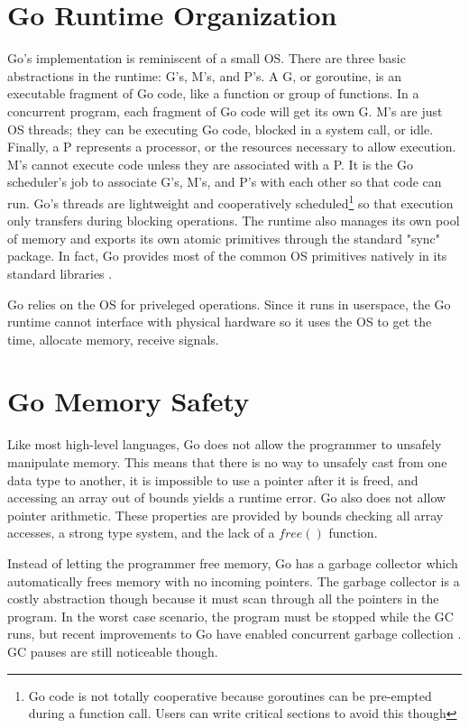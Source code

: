 \section{Go Runtime Organization}
Go's implementation is reminiscent of a small OS. There are three basic
abstractions in the runtime: G's, M's, and P's. A G, or goroutine, is an
executable fragment of Go code, like a function or group of functions. In a concurrent program,
each fragment of Go code will get its
own G. M's are just OS threads; they can be executing Go code, blocked in a system call,
or idle. Finally, a P represents a processor, or the resources necessary to
allow execution. M's cannot execute code unless they are associated with a P.
It is the Go scheduler's job to associate G's, M's, and P's with each other so
that code can run. Go's threads are lightweight and
cooperatively scheduled\footnote{Go code is not totally cooperative because goroutines can be pre-empted during a function call. Users can write critical sections to avoid this though}
so that execution only transfers during
blocking operations. The runtime also manages its own pool of memory
and exports its own atomic primitives through the standard "sync"
package. In fact, Go provides most of the common OS primitives natively
in its standard libraries \cite{gostd}.

Go relies on the OS for priveleged operations. Since it runs in userspace,
the Go runtime cannot interface with physical hardware so it uses the OS
to get the time, allocate memory, receive signals.


\section{Go Memory Safety}
Like most high-level languages, Go does not allow the programmer to unsafely
manipulate memory. This means that there is no way to unsafely cast from one data type
to another, it is impossible to use a pointer after it is freed, and accessing
an array out of bounds yields a runtime error. Go also does not allow pointer arithmetic.
These properties are provided by bounds checking all array accesses, a strong type system,
and the lack of a $free()$ function.

Instead of letting the programmer free memory, Go
has a garbage collector which automatically frees memory with no incoming pointers.
The garbage collector is a costly abstraction though because it must scan through all
the pointers in the program. In the worst case scenario, the program must be
stopped while the GC runs, but recent improvements to Go have enabled concurrent garbage collection \cite{gogc}.
GC pauses are still noticeable though.

